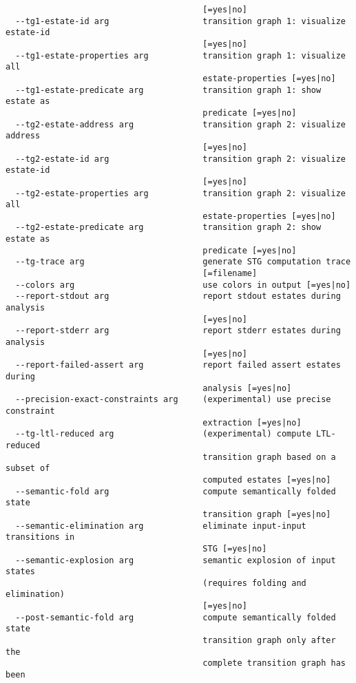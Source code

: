 \documentclass[natbib]{article}
\begin{document}
\begin{verbatim}
                                        [=yes|no]
  --tg1-estate-id arg                   transition graph 1: visualize estate-id
                                        [=yes|no]
  --tg1-estate-properties arg           transition graph 1: visualize all 
                                        estate-properties [=yes|no]
  --tg1-estate-predicate arg            transition graph 1: show estate as 
                                        predicate [=yes|no]
  --tg2-estate-address arg              transition graph 2: visualize address 
                                        [=yes|no]
  --tg2-estate-id arg                   transition graph 2: visualize estate-id
                                        [=yes|no]
  --tg2-estate-properties arg           transition graph 2: visualize all 
                                        estate-properties [=yes|no]
  --tg2-estate-predicate arg            transition graph 2: show estate as 
                                        predicate [=yes|no]
  --tg-trace arg                        generate STG computation trace 
                                        [=filename]
  --colors arg                          use colors in output [=yes|no]
  --report-stdout arg                   report stdout estates during analysis 
                                        [=yes|no]
  --report-stderr arg                   report stderr estates during analysis 
                                        [=yes|no]
  --report-failed-assert arg            report failed assert estates during 
                                        analysis [=yes|no]
  --precision-exact-constraints arg     (experimental) use precise constraint 
                                        extraction [=yes|no]
  --tg-ltl-reduced arg                  (experimental) compute LTL-reduced 
                                        transition graph based on a subset of 
                                        computed estates [=yes|no]
  --semantic-fold arg                   compute semantically folded state 
                                        transition graph [=yes|no]
  --semantic-elimination arg            eliminate input-input transitions in 
                                        STG [=yes|no]
  --semantic-explosion arg              semantic explosion of input states 
                                        (requires folding and elimination) 
                                        [=yes|no]
  --post-semantic-fold arg              compute semantically folded state 
                                        transition graph only after the 
                                        complete transition graph has been 

\end{verbatim}
\end{document}
